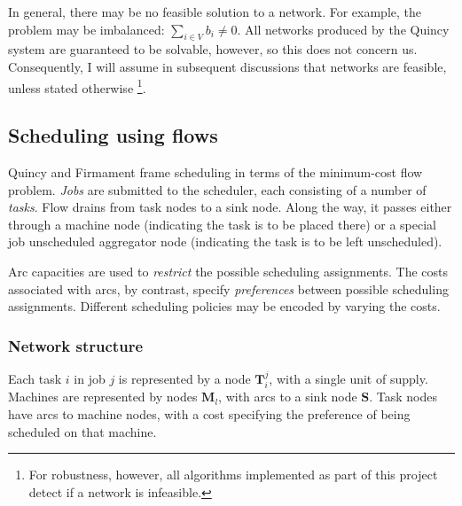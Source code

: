 In general, there may be no feasible solution to a network. For example,
the problem may be imbalanced: $\sum_{i\in V}b_{i}\neq0$. All networks
produced by the Quincy system are guaranteed to be solvable, however,
so this does not concern us. Consequently, I will assume in subsequent
discussions that networks are feasible, unless stated otherwise%
\footnote{For robustness, however, all algorithms implemented as part of this project detect if a network is infeasible.}.

\subsection{Scheduling using flows}


Quincy and Firmament frame scheduling in terms of the minimum-cost flow problem. \emph{Jobs} are submitted to the scheduler, each consisting of a number of \emph{tasks}. Flow drains from task nodes to a sink node. Along the way, it passes either through a machine node (indicating the task is to be placed there) or a special job unscheduled aggregator node (indicating the task is to be left unscheduled).

Arc capacities are used to \emph{restrict} the possible scheduling assignments. The costs associated with arcs, by contrast, specify \emph{preferences} between possible scheduling assignments. Different scheduling policies may be encoded by varying the costs.

\subsubsection{Network structure}

Each task $i$ in job $j$ is represented by a node $\mathbf{T}_i^j$, with a single unit of supply. Machines are represented by nodes $\mathbf{M}_l$, with arcs to a sink node $\mathbf{S}$. Task nodes have arcs to machine nodes, with a cost specifying the preference of being scheduled on that machine.

